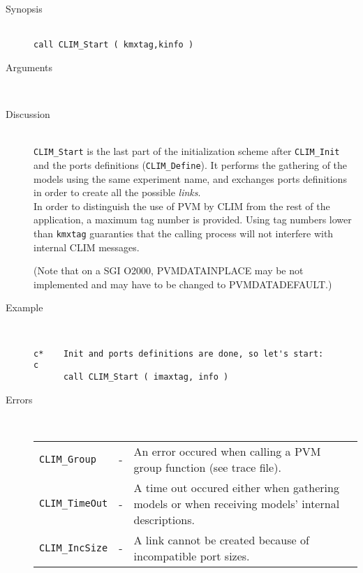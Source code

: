 %
%
\begin{description}
  \item[Synopsis]~ \\[10pt]
    {\tt call CLIM\_Start ( kmxtag,kinfo )}
  \item[Arguments]~
  \item[Discussion]~\\[10pt]
    {\tt CLIM\_Start} is the last part of the initialization scheme
    after {\tt CLIM\_Init} and the ports definitions ({\tt CLIM\_Define}).
    It performs the gathering of the models using the same experiment
    name, and exchanges ports definitions in order to create all the
    possible {\it links}. \\

    In order to distinguish the use of PVM by CLIM from the rest of
    the application, a maximum tag number is provided. Using tag numbers
    lower than {\tt kmxtag} guaranties that the calling process will not
    interfere with internal CLIM messages.

    (Note that on a SGI O2000, PVMDATAINPLACE may be not implemented
    and may have to be changed to PVMDATADEFAULT.)
  \item[Example]~
    \begin{verbatim}
c*    Init and ports definitions are done, so let's start:
c 
      call CLIM_Start ( imaxtag, info )
    \end{verbatim}
  \item[Errors]~\\[10pt]
    \begin{tabular}{l l p{10cm} }
      {\tt CLIM\_Group} & - & An error occured when calling a PVM group
function (see trace file). \\
      {\tt CLIM\_TimeOut} & - & A time out occured either when gathering
models or when receiving models' internal descriptions. \\
      {\tt CLIM\_IncSize} & - & A link cannot be created because of
incompatible port sizes. \\
    \end{tabular}
\end{description}
